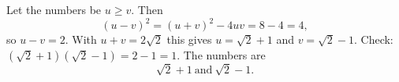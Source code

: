 Let the numbers be \(u\ge v\). Then
\[
(u-v)^2=(u+v)^2-4uv=8-4=4,
\]
so \(u-v=2\). With \(u+v=2\sqrt2\) this gives \(u=\sqrt2+1\) and \(v=\sqrt2-1\). Check: \((\sqrt2+1)(\sqrt2-1)=2-1=1\). The numbers are
\[
\boxed{\sqrt2+1\ \text{and}\ \sqrt2-1}.
\]
